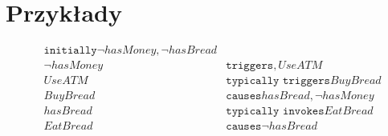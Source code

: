 \section{Przykłady}
\begin{example}
	\begin{align*}
		&\texttt{initially} \neg hasMoney, \neg hasBread \\
	 	&\neg hasMoney &\texttt{triggers}, UseATM \\
		&UseATM &\texttt{typically triggers} BuyBread \\
		&BuyBread &\texttt{causes} hasBread, \neg hasMoney \\
		&hasBread &\texttt{typically invokes} EatBread \\
 		&EatBread &\texttt{causes} \neg hasBread \\
	\end{align*}
\end{example}


